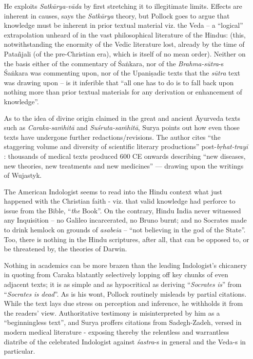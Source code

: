 He exploits {\sl Satkārya-vāda} by first stretching it to illegitimate limits. Effects are inherent in causes, says the {\sl Satkārya} theory, but Pollock goes to argue that knowledge must be inherent in prior textual material viz. the Veda -- a “logical” extrapolation unheard of in the vast philosophical literature of the Hindus: (this, notwithstanding the enormity of the Vedic literature lost, already by the time of Patañjali (of the pre-Christian era), which is itself of no mean order). Neither on the basis either of the commentary of Śaṅkara, nor of the \hbox{{\sl Brahma-sūtra}-s} Śaṅkara was commenting upon, nor of the Upaniṣadic texts that the {\sl sūtra} text was drawing upon -- is it inferible that “all one has to do is to fall back upon nothing more than prior textual materials for any derivation or enhancement of knowledge”.

As to the idea of divine origin claimed in the great and ancient Āyurveda texts such as {\sl Caraka-saṁhitā} and {\sl Suśruta-saṁhitā}, Surya points out how even those texts have undergone further redactions/revisions. The author cites “the staggering volume and diversity of scientific literary productions” post-{\sl bṛhat-trayī} : thousands of medical texts produced 600 CE onwards describing “new diseases, new theories, new treatments and new medicines” --- drawing upon the writings of Wujastyk.

The American Indologist seems to read into the Hindu context what just happened with the Christian faith - viz. that valid knowledge had perforce to issue from the Bible, “{\sl the} Book”. On the contrary, Hindu India never witnessed any Inquisition -- no Galileo incarcerated, no Bruno burnt; and no Socrates made to drink hemlock on grounds of {\sl asabeia} -- “not believing in the god of the State”. Too, there is nothing in the Hindu scriptures, after all, that can be opposed to, or be threatened by, the theories of Darwin.

Nothing in academics can be more brazen than the leading Indologist’s chicanery in quoting from Caraka blatantly selectively lopping off key chunks of even adjacent texts; it is as simple and as hypocritical as deriving “{\sl Socrates is}” from “{\sl Socrates is dead}”. As is his wont, Pollock routinely misleads by partial citations. While the text lays due stress on perception and inference, he withholds it from the readers’ view. Authoritative testimony is misinterpreted by him as a “beginningless text”, and Surya proffers citations from Sadegh-Zadeh, versed in modern medical literature - exposing thereby the relentless and warrantless diatribe of the celebrated Indologist against {\sl śastra}-s in general and the Veda-s in particular.
\vskip 6pt


